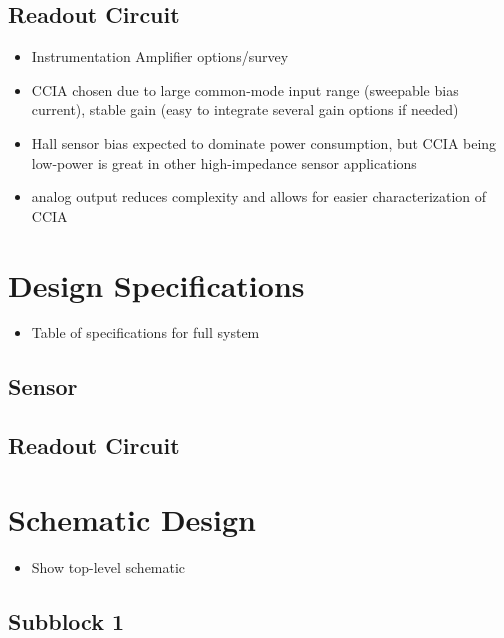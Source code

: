 \documentclass{article}
\begin{document}
\subsection{Readout Circuit}

\begin{itemize}
    \item Instrumentation Amplifier options/survey
    \item CCIA chosen due to large common-mode input range (sweepable bias current), stable gain (easy to integrate several gain options if needed)
    \item Hall sensor bias expected to dominate power consumption, but CCIA being low-power is great in other high-impedance sensor applications
    \item analog output reduces complexity and allows for easier characterization of CCIA
\end{itemize}

\newpage

\section{Design Specifications}

\begin{itemize}
    \item Table of specifications for full system
\end{itemize}

\subsection{Sensor}

\subsection{Readout Circuit}

\newpage

\section{Schematic Design}

\begin{itemize}
    \item Show top-level schematic 
\end{itemize}

\subsection{Subblock 1}
\end{document}
